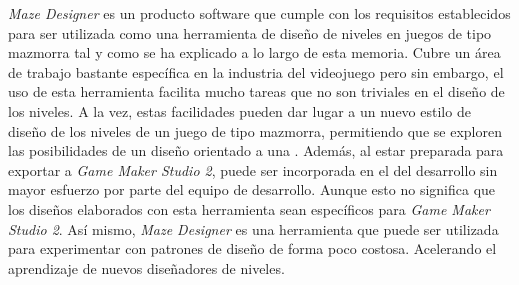 \textit{Maze Designer} es un producto software que cumple con los requisitos establecidos para ser utilizada como una herramienta de diseño de niveles en juegos de tipo mazmorra tal y como se ha explicado a lo largo de esta memoria.
Cubre un área de trabajo bastante específica en la industria del videojuego pero sin embargo, el uso de esta herramienta facilita mucho tareas que no son triviales en el diseño de los niveles. A la vez, estas facilidades pueden dar lugar a un nuevo estilo de diseño de los niveles de un juego de tipo mazmorra, permitiendo que se exploren las posibilidades de un diseño orientado a una .
Además, al estar preparada para exportar a \textit{Game Maker Studio 2}, puede ser incorporada en el  del desarrollo sin mayor esfuerzo por parte del equipo de desarrollo. Aunque esto no significa que los diseños elaborados con esta herramienta sean específicos para \textit{Game Maker Studio 2}.
Así mismo, \textit{Maze Designer} es una herramienta que puede ser utilizada para experimentar con patrones de diseño de forma poco costosa. Acelerando el aprendizaje de nuevos diseñadores de niveles.